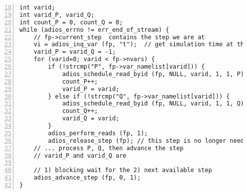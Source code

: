 \begin{lstlisting}[numbers=left, numberstyle=\color{gray}, stepnumber=2,firstnumber=18,
                             caption={Processing varying set of variables in a stream},  label=code:stream_stepbystep]
int varid;
int varid_P, varid_Q;
int count_P = 0, count_Q = 0;
while (adios_errno != err_end_of_stream) {
    // fp->current_step  contains the step we are at
    vi = adios_inq_var (fp, "t");  // get simulation time at this step
    varid_P = varid_Q = -1; 
    for (varid=0; varid < fp->nvars) {
        if (!strcmp("P", fp->var_namelist[varid])) {
            adios_schedule_read_byid (fp, NULL, varid, 1, 1, P);
            count_P++;
            varid_P = varid;
        } else if (!strcmp("Q", fp->var_namelist[varid])) {
            adios_schedule_read_byid (fp, NULL, varid, 1, 1, Q);
            count_Q++;
            varid_Q = varid;
        }
        adios_perform_reads (fp, 1);   
        adios_release_step (fp); // this step is no longer needed (optional call)
    // ... process P, Q, then advance the step
    // varid_P and varid_Q are

    // 1) blocking wait for the 2) next available step 
    adios_advance_step (fp, 0, 1);
}
\end{lstlisting}

